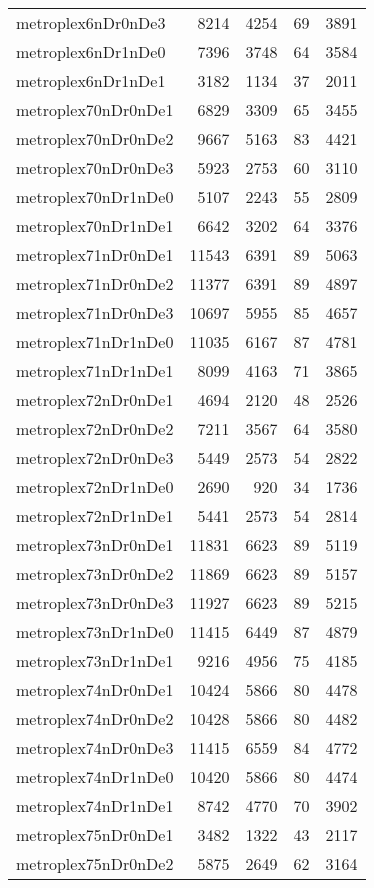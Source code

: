 \begin{longtable}{lrrrr}
metroplex6nDr0nDe3 & 8214 & 4254 & 69 & 3891 \\
metroplex6nDr1nDe0 & 7396 & 3748 & 64 & 3584 \\
metroplex6nDr1nDe1 & 3182 & 1134 & 37 & 2011 \\
metroplex70nDr0nDe1 & 6829 & 3309 & 65 & 3455 \\
metroplex70nDr0nDe2 & 9667 & 5163 & 83 & 4421 \\
metroplex70nDr0nDe3 & 5923 & 2753 & 60 & 3110 \\
metroplex70nDr1nDe0 & 5107 & 2243 & 55 & 2809 \\
metroplex70nDr1nDe1 & 6642 & 3202 & 64 & 3376 \\
metroplex71nDr0nDe1 & 11543 & 6391 & 89 & 5063 \\
metroplex71nDr0nDe2 & 11377 & 6391 & 89 & 4897 \\
metroplex71nDr0nDe3 & 10697 & 5955 & 85 & 4657 \\
metroplex71nDr1nDe0 & 11035 & 6167 & 87 & 4781 \\
metroplex71nDr1nDe1 & 8099 & 4163 & 71 & 3865 \\
metroplex72nDr0nDe1 & 4694 & 2120 & 48 & 2526 \\
metroplex72nDr0nDe2 & 7211 & 3567 & 64 & 3580 \\
metroplex72nDr0nDe3 & 5449 & 2573 & 54 & 2822 \\
metroplex72nDr1nDe0 & 2690 & 920 & 34 & 1736 \\
metroplex72nDr1nDe1 & 5441 & 2573 & 54 & 2814 \\
metroplex73nDr0nDe1 & 11831 & 6623 & 89 & 5119 \\
metroplex73nDr0nDe2 & 11869 & 6623 & 89 & 5157 \\
metroplex73nDr0nDe3 & 11927 & 6623 & 89 & 5215 \\
metroplex73nDr1nDe0 & 11415 & 6449 & 87 & 4879 \\
metroplex73nDr1nDe1 & 9216 & 4956 & 75 & 4185 \\
metroplex74nDr0nDe1 & 10424 & 5866 & 80 & 4478 \\
metroplex74nDr0nDe2 & 10428 & 5866 & 80 & 4482 \\
metroplex74nDr0nDe3 & 11415 & 6559 & 84 & 4772 \\
metroplex74nDr1nDe0 & 10420 & 5866 & 80 & 4474 \\
metroplex74nDr1nDe1 & 8742 & 4770 & 70 & 3902 \\
metroplex75nDr0nDe1 & 3482 & 1322 & 43 & 2117 \\
metroplex75nDr0nDe2 & 5875 & 2649 & 62 & 3164 \\

\end{longtable}
